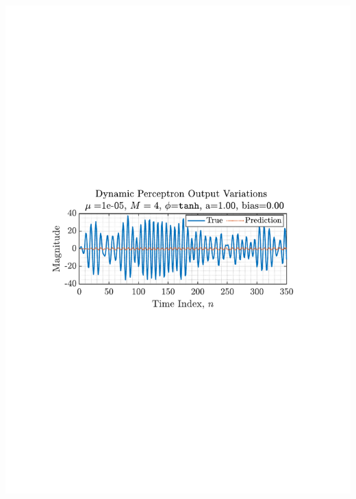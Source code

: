 \documentclass[12pt]{article}
\begin{document}
		\begin{minipage}[b]{0.49\textwidth}
			\centering
			\includegraphics[trim={2.2cm 11.2cm 3.15cm  11.2cm}, clip, width=\textwidth]{../MATLAB/figures/q4_2_fig01.pdf} 
			\captionsetup{justification=centering}
			\label{fig: 4-2}
		\end{minipage}%
	
	
\end{document}
